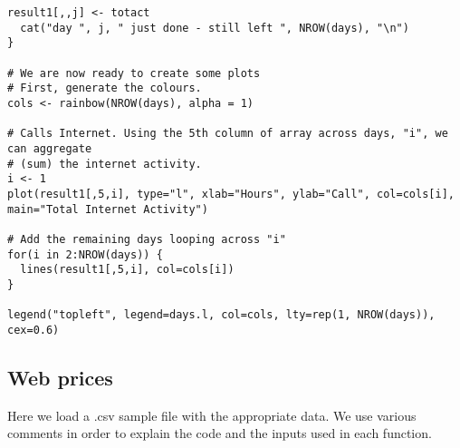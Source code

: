 \documentclass[12pt]{article}
\begin{document}
\begin{lstlisting}[title=\textbf{Mobile phone data aggregation and plots.}]
  result1[,,j] <- totact
  cat("day ", j, " just done - still left ", NROW(days), "\n")
}

# We are now ready to create some plots
# First, generate the colours.
cols <- rainbow(NROW(days), alpha = 1)

# Calls Internet. Using the 5th column of array across days, "i", we can aggregate 
# (sum) the internet activity.
i <- 1
plot(result1[,5,i], type="l", xlab="Hours", ylab="Call", col=cols[i], main="Total Internet Activity")

# Add the remaining days looping across "i"
for(i in 2:NROW(days)) {
  lines(result1[,5,i], col=cols[i])
}

legend("topleft", legend=days.l, col=cols, lty=rep(1, NROW(days)), cex=0.6)
\end{lstlisting}

\subsection{Web prices \textendash{} {\href{https://github.com/eurostat/econowcast/blob/master/extract/Prices.R}{}}}

Here we load a .csv sample file with the appropriate data. We use various
comments in order to explain the code and the inputs used in each function.
\end{document}
